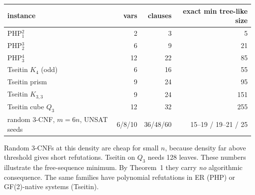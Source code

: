 \documentclass[11pt]{article}
\begin{document}
\begin{center}\begin{tabular}{lrrr}
instance & vars & clauses & exact min tree-like size\\\hline
PHP$^2_1$ & 2 & 3 & 5\\
PHP$^3_2$ & 6 & 9 & 21\\
PHP$^4_3$ & 12 & 22 & 85\\
Tseitin $K_4$ (odd) & 6 & 16 & 55\\
Tseitin prism & 9 & 24 & 95\\
Tseitin $K_{3,3}$ & 9 & 24 & 151\\
Tseitin cube $Q_3$ & 12 & 32 & 255\\
random 3-CNF, $m=6n$, UNSAT seeds & 6/8/10 & 36/48/60 & 15--19 / 19--21 / 25\\
\end{tabular}\end{center}
Random 3-CNFs at this density are cheap for small $n$, because density far above
threshold gives short refutations. Tseitin on $Q_3$ needs 128 leaves. These
numbers illustrate the free-sequence minimum. By Theorem~1 they carry
\emph{no} algorithmic consequence. The same families have polynomial refutations in ER
(PHP) or GF(2)-native systems (Tseitin).
\end{document}
